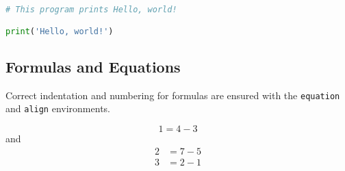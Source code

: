 \documentclass[biblatex]{lni}
\begin{document}
\begin{lstlisting}[caption={A Python Program}, label=python-hello-world, language=Python]
# This program prints Hello, world!

print('Hello, world!')
\end{lstlisting}

\subsection{Formulas and Equations}

Correct indentation and numbering for formulas are ensured with the \texttt{equation} and \texttt{align} environments.

\begin{equation}
  1=4-3
\end{equation}
and
\begin{align}
  2&=7-5\\
  3&=2-1
\end{align}

\printbibliography
\end{document}
